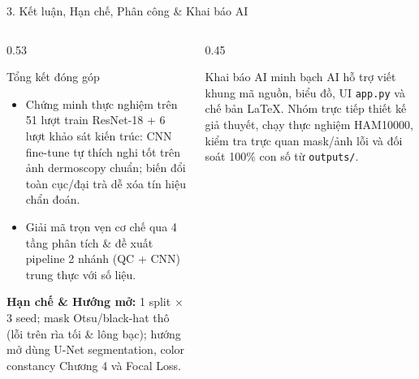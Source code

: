 \documentclass[aspectratio=169,10pt]{beamer}
\begin{document}
\begin{frame}{3. Kết luận, Hạn chế, Phân công \& Khai báo AI}
\begin{columns}[T,onlytextwidth]
\begin{column}{0.53\textwidth}
\footnotesize
\begin{block}{Tổng kết đóng góp}
\begin{itemize}
    \item Chứng minh thực nghiệm trên 51 lượt train ResNet-18 + 6 lượt khảo sát kiến trúc: CNN fine-tune tự thích nghi tốt trên ảnh dermoscopy chuẩn; biến đổi toàn cục/đại trà dễ xóa tín hiệu chẩn đoán.
    \item Giải mã trọn vẹn cơ chế qua 4 tầng phân tích \& đề xuất pipeline 2 nhánh (QC + CNN) trung thực với số liệu.
\end{itemize}
\end{block}
\vspace{2pt}
\scriptsize
\textbf{Hạn chế \& Hướng mở:} 1 split $\times$ 3 seed; mask Otsu/black-hat thô (lỗi trên rìa tối \& lông bạc); hướng mở dùng U-Net segmentation, color constancy Chương 4 và Focal Loss.
\end{column}
\begin{column}{0.45\textwidth}
\vspace{4pt}
\begin{block}{Khai báo AI minh bạch}
\tiny AI hỗ trợ viết khung mã nguồn, biểu đồ, UI \texttt{app.py} và chế bản LaTeX. Nhóm trực tiếp thiết kế giả thuyết, chạy thực nghiệm HAM10000, kiểm tra trực quan mask/ảnh lỗi và đối soát 100\% con số từ \texttt{outputs/}.
\end{block}
\end{column}
\end{columns}
\end{frame}
\end{document}
